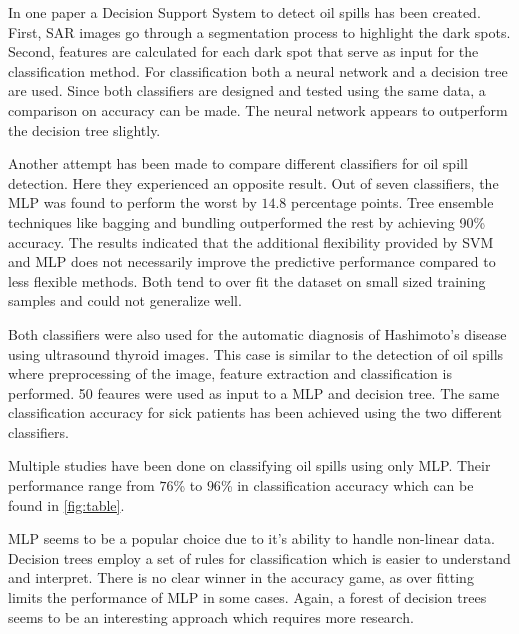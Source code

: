 In one paper a Decision Support System to detect oil spills has been created. First, SAR images go through a segmentation process to highlight the dark spots. Second, features are calculated for each dark spot that serve as input for the classification method.  For classification both a neural network and a decision tree are used. Since both classifiers are designed and tested using the same data, a comparison on accuracy can be made. The neural network appears to outperform the decision tree slightly.
	
Another attempt has been made to compare different classifiers for oil spill detection.\cite{Xu201414} Here they experienced an opposite result. Out of seven classifiers, the MLP was found to perform the worst by $14.8$ percentage points. Tree ensemble techniques like bagging and bundling outperformed the rest by achieving 90\% accuracy. The results indicated that the additional flexibility provided by SVM and MLP does not necessarily improve the predictive performance compared to less flexible methods. Both tend to over fit the dataset on small sized training samples and could not generalize well. 
	
Both classifiers were also used for the automatic diagnosis of Hashimoto's disease using ultrasound thyroid images\cite{Omiotek201340}. This case is similar to the detection of oil spills where preprocessing of the image, feature extraction and classification is performed. 50 feaures were used as input to a MLP and decision tree. The same classification accuracy for sick patients has been achieved using the two different classifiers.

Multiple studies\cite{Topouzelis200762}\cite{Delfrate200038}\cite{Topouzelis200930}\cite{Topouzelis200924}\cite{Delfrate2004} have been done on classifying oil spills using only MLP. Their performance range from $76$\% to $96$\% in classification accuracy which can be found in \ref{fig:table}. 

MLP seems to be a popular choice due to it's ability to handle non-linear data. Decision trees employ a set of rules for classification which is easier to understand and interpret. There is no clear winner in the accuracy game, as over fitting limits the performance of MLP in some cases. Again, a forest of decision trees seems to be an interesting approach which requires more research.






	